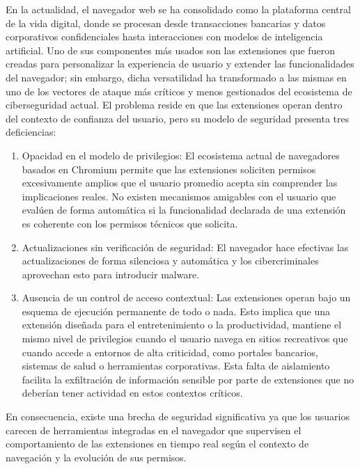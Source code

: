 \documentclass[12pt,oneside]{report}
\begin{document}
\begingroup
\setlength{\parindent}{0pt}
\setlength{\parskip}{0.6em}

En la actualidad, el navegador web se ha consolidado como la plataforma central de la vida digital, donde se procesan desde transacciones bancarias y datos corporativos confidenciales hasta interacciones con modelos de inteligencia artificial. Uno de sus componentes más usados son las extensiones que fueron creadas para personalizar la experiencia de usuario y extender las funcionalidades del navegador; sin embargo, dicha versatilidad ha transformado a las mismas en uno de los vectores de ataque más críticos y menos gestionados del ecosistema de ciberseguridad actual. El problema reside en que las extensiones operan dentro del contexto de confianza del usuario, pero su modelo de seguridad presenta tres deficiencias:

\begin{enumerate}
    \item Opacidad en el modelo de privilegios: El ecosistema actual de navegadores basados en Chromium permite que las extensiones soliciten permisos excesivamente amplios que el usuario promedio acepta sin comprender las implicaciones reales. No existen mecanismos amigables con el usuario que evalúen de forma automática si la funcionalidad declarada de una extensión es coherente con los permisos técnicos que solicita.
    \item Actualizaciones sin verificación de seguridad: El navegador hace efectivas las actualizaciones de forma silenciosa y automática y los cibercriminales aprovechan esto para introducir malware.
    \item Ausencia de un control de acceso contextual: Las extensiones operan bajo un esquema de ejecución permanente de todo o nada. Esto implica que una extensión diseñada para el entretenimiento o la productividad, mantiene el mismo nivel de privilegios cuando el usuario navega en sitios recreativos que cuando accede a entornos de alta criticidad, como portales bancarios, sistemas de salud o herramientas corporativas. Esta falta de aislamiento facilita la exfiltración de información sensible por parte de extensiones que no deberían tener actividad en estos contextos críticos.
\end{enumerate}

En consecuencia, existe una brecha de seguridad significativa ya que los usuarios carecen de herramientas integradas en el navegador que supervisen el comportamiento de las extensiones en tiempo real según el contexto de navegación y la evolución de sus permisos.
\end{document}
